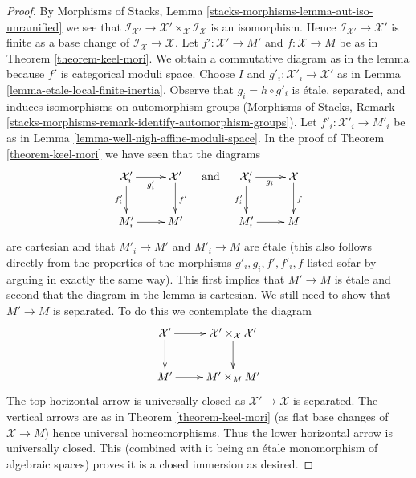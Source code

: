 \documentclass[10pt,a4paper]{amsart}
\theoremstyle{plain}
\theoremstyle{definition}
\theoremstyle{remark}
\numberwithin{equation}{subsection}
\begin{document}
\begin{proof}
By Morphisms of Stacks, Lemma \ref{stacks-morphisms-lemma-aut-iso-unramified}
we see that
$\mathcal{I}_{\mathcal{X}'} \to
\mathcal{X}' \times_\mathcal{X} \mathcal{I}_\mathcal{X}$
is an isomorphism. Hence $\mathcal{I}_{\mathcal{X}'} \to \mathcal{X}'$
is finite as a base change of $\mathcal{I}_\mathcal{X} \to \mathcal{X}$.
Let $f' : \mathcal{X}' \to M'$ and $f : \mathcal{X} \to M$ be as in
Theorem \ref{theorem-keel-mori}.
We obtain a commutative diagram as in the lemma because
$f'$ is categorical moduli space.
Choose $I$ and $g'_i : \mathcal{X}'_i \to \mathcal{X}'$ as in
Lemma \ref{lemma-etale-local-finite-inertia}.
Observe that $g_i = h \circ g'_i$
is \'etale, separated, and induces isomorphisms on
automorphism groups (Morphisms of Stacks, Remark
\ref{stacks-morphisms-remark-identify-automorphism-groups}).
Let $f'_i : \mathcal{X}'_i \to M'_i$ be as in
Lemma \ref{lemma-well-nigh-affine-moduli-space}.
In the proof of Theorem \ref{theorem-keel-mori}
we have seen that the diagrams
$$
\xymatrix{
\mathcal{X}'_i \ar[d]_{f'_i} \ar[r]_{g'_i} &
\mathcal{X}' \ar[d]^{f'} \\
M'_i \ar[r] &
M'
}
\quad\text{and}\quad
\xymatrix{
\mathcal{X}'_i \ar[d]_{f'_i} \ar[r]_{g_i} &
\mathcal{X} \ar[d]^f \\
M'_i \ar[r] &
M
}
$$
are cartesian and that $M'_i \to M'$ and $M'_i \to M$ are \'etale
(this also follows directly from the properties of the morphisms
$g'_i, g_i, f', f'_i, f$ listed sofar by arguing in exactly the same way).
This first implies that $M' \to M$ is \'etale and second that
the diagram in the lemma is cartesian. We still need to show
that $M' \to M$ is separated. To do this we contemplate the
diagram
$$
\xymatrix{
\mathcal{X}' \ar[r] \ar[d] &
\mathcal{X}' \times_\mathcal{X} \mathcal{X}' \ar[d] \\
M' \ar[r] &
M' \times_M M'
}
$$
The top horizontal arrow is universally closed as
$\mathcal{X}' \to \mathcal{X}$ is separated.
The vertical arrows are as in Theorem \ref{theorem-keel-mori}
(as flat base changes of $\mathcal{X} \to M$)
hence universal homeomorphisms. Thus the lower horizontal
arrow is universally closed. This (combined with it being an \'etale
monomorphism of algebraic spaces) proves it is a closed immersion as desired.
\end{proof}
\end{document}
